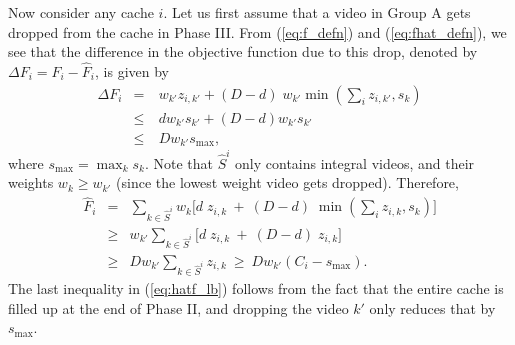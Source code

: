 \documentclass[conference]{IEEEtran}
\begin{document}
Now consider any cache $i$. Let us first assume that a video in Group A gets dropped from the cache in Phase III. From (\ref{eq:f_defn}) and (\ref{eq:fhat_defn}), we see that the difference in the objective function due to this drop, denoted by $\Delta F_i = F_i - \hat{F}_i$, is given by
\begin{eqnarray}
\Delta F_i & = & \ w_{k'} z_{i,k'} + (D-d)\;w_{k'} \min(\sum_i z_{i,k'}, s_{k}) \nonumber\\
& \leq & \ d w_{k'} s_{k'} + (D-d) w_{k'} s_{k'} \nonumber\\
& \leq & \ D w_{k'} s_{\max},
\label{eq:deltaf}
\end{eqnarray}
where $s_{\max} = \max_k s_k$. Note that $\hat{S}^i$ only contains integral videos, and their weights $w_k \geq w_{k'}$ (since the lowest weight video gets dropped). Therefore,
\begin{eqnarray}
    \hat{F}_i & = & \sum_{k \in \hat{S}^i} w_k \bigg[ d\; z_{i,k}  \ + \  (D-d)\; \min(\sum_i z_{i,k},s_k) \bigg]\nonumber\\
    & \geq & w_{k'} \sum_{k \in \hat{S}^i} \bigg[ d\; z_{i,k}  \ + \  (D-d)\; z_{i,k} \bigg]\nonumber\\
    & \geq & D w_{k'}  \sum_{k \in \hat{S}^i} z_{i,k} \ \geq \ D w_{k'} (C_i - s_{\max}). 
    \label{eq:hatf_lb} 
\end{eqnarray}
The last inequality in (\ref{eq:hatf_lb}) follows from the fact that the entire cache is filled up at the end of Phase II, and dropping the video $k'$ only reduces that by $s_{\max}$. 
\end{document}
